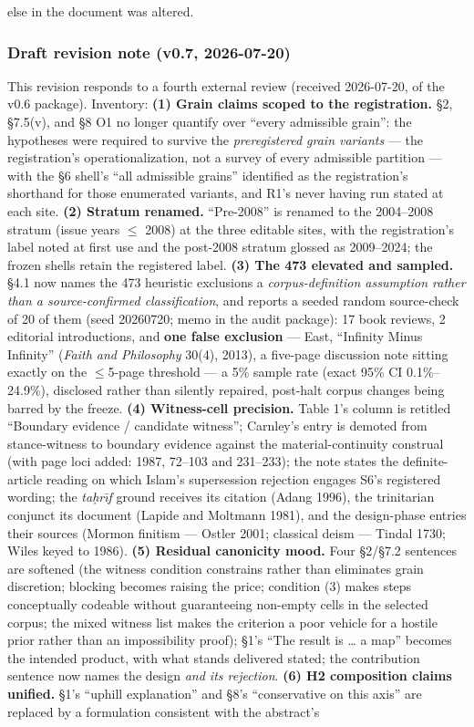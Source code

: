 else in the document was altered.

\subsubsection{Draft revision note (v0.7, 2026-07-20)}\label{draft-revision-note-v0.7-2026-07-20}

This revision responds to a fourth external review (received 2026-07-20, of the v0.6 package). Inventory: \textbf{(1) Grain claims scoped to the registration.} \S{}2, \S{}7.5(v), and \S{}8 O1 no longer quantify over ``every admissible grain'': the hypotheses were required to survive the \emph{preregistered grain variants} --- the registration's operationalization, not a survey of every admissible partition --- with the \S{}6 shell's ``all admissible grains'' identified as the registration's shorthand for those enumerated variants, and R1's never having run stated at each site. \textbf{(2) Stratum renamed.} ``Pre-2008'' is renamed to the 2004--2008 stratum (issue years $\le$ 2008) at the three editable sites, with the registration's label noted at first use and the post-2008 stratum glossed as 2009--2024; the frozen shells retain the registered label. \textbf{(3) The 473 elevated and sampled.} \S{}4.1 now names the 473 heuristic exclusions a \emph{corpus-definition assumption rather than a source-confirmed classification}, and reports a seeded random source-check of 20 of them (seed 20260720; memo in the audit package): 17 book reviews, 2 editorial introductions, and \textbf{one false exclusion} --- East, ``Infinity Minus Infinity'' (\emph{Faith and Philosophy} 30(4), 2013), a five-page discussion note sitting exactly on the $\le$5-page threshold --- a 5\% sample rate (exact 95\% CI 0.1\%--24.9\%), disclosed rather than silently repaired, post-halt corpus changes being barred by the freeze. \textbf{(4) Witness-cell precision.} Table 1's column is retitled ``Boundary evidence / candidate witness''; Carnley's entry is demoted from stance-witness to boundary evidence against the material-continuity construal (with page loci added: 1987, 72--103 and 231--233); the note states the definite-article reading on which Islam's supersession rejection engages S6's registered wording; the \emph{ta\d{h}r\={\i}f} ground receives its citation (Adang 1996), the trinitarian conjunct its document (Lapide and Moltmann 1981), and the design-phase entries their sources (Mormon finitism --- Ostler 2001; classical deism --- Tindal 1730; Wiles keyed to 1986). \textbf{(5) Residual canonicity mood.} Four \S{}2/\S{}7.2 sentences are softened (the witness condition constrains rather than eliminates grain discretion; blocking becomes raising the price; condition (3) makes steps conceptually codeable without guaranteeing non-empty cells in the selected corpus; the mixed witness list makes the criterion a poor vehicle for a hostile prior rather than an impossibility proof); \S{}1's ``The result is \ldots{} a map'' becomes the intended product, with what stands delivered stated; the contribution sentence now names the design \emph{and its rejection}. \textbf{(6) H2 composition claims unified.} \S{}1's ``uphill explanation'' and \S{}8's ``conservative on this axis'' are replaced by a formulation consistent with the abstract's 